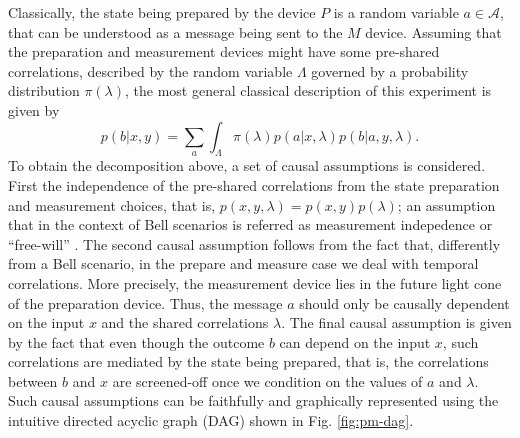 \documentclass[a4paper,preprintnumbers,floatfix,superscriptaddress,pra,twocolumn,showpacs,notitlepage,longbibliography]{revtex4-2}
\begin{document}
    Classically, the state being prepared by the device $P$ is a random variable $a \in \mathcal{A}$, that can be understood as a message being sent to the $M$ device. Assuming that the preparation and measurement devices might have some pre-shared correlations, described by the random variable $\Lambda$ governed by a probability distribution $\pi(\lambda)$, the most general classical description of this experiment is given by
    \begin{equation}
        p(b \vert x, y) = \sum_a \int_\Lambda \pi(\lambda) p(a \vert x, \lambda) p(b \vert a, y, \lambda).
        \label{eq:classical-model}
    \end{equation}
    To obtain the decomposition above, a set of causal assumptions is considered. First the independence of the pre-shared correlations from the state preparation and measurement choices, that is, $p(x,y,\lambda)=p(x,y)p(\lambda)$; an assumption that in the context of Bell scenarios is referred as measurement indepedence or ``free-will'' \cite{hall2010local,wood2015lesson,chaves2015unifying}. The second causal assumption follows from the fact that, differently from a Bell scenario, in the prepare and measure case we deal with temporal correlations. More precisely, the measurement device lies in the future light cone of the preparation device. Thus, the message $a$ should only be causally dependent on the input $x$ and the shared correlations $\lambda$. The final causal assumption is given by the fact that even though the outcome $b$ can depend on the input $x$, such correlations are mediated by the state being prepared, that is, the correlations between $b$ and $x$ are screened-off once we condition on the values of $a$ and $\lambda$. Such causal assumptions can be faithfully and graphically represented using the intuitive directed acyclic graph (DAG) shown in Fig. \ref{fig:pm-dag}. 
\end{document}
